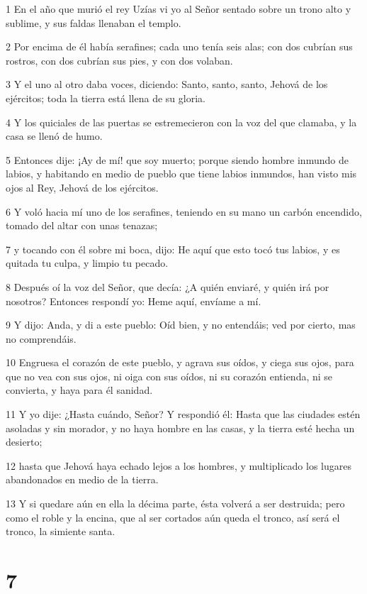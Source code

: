 \par 1 En el año que murió el rey Uzías vi yo al Señor sentado sobre un trono alto y sublime, y sus faldas llenaban el templo.
\par 2 Por encima de él había serafines; cada uno tenía seis alas; con dos cubrían sus rostros, con dos cubrían sus pies, y con dos volaban.
\par 3 Y el uno al otro daba voces, diciendo: Santo, santo, santo, Jehová de los ejércitos; toda la tierra está llena de su gloria.
\par 4 Y los quiciales de las puertas se estremecieron con la voz del que clamaba, y la casa se llenó de humo. 
\par 5 Entonces dije: ¡Ay de mí! que soy muerto; porque siendo hombre inmundo de labios, y habitando en medio de pueblo que tiene labios inmundos, han visto mis ojos al Rey, Jehová de los ejércitos.
\par 6 Y voló hacia mí uno de los serafines, teniendo en su mano un carbón encendido, tomado del altar con unas tenazas;
\par 7 y tocando con él sobre mi boca, dijo: He aquí que esto tocó tus labios, y es quitada tu culpa, y limpio tu pecado.
\par 8 Después oí la voz del Señor, que decía: ¿A quién enviaré, y quién irá por nosotros? Entonces respondí yo: Heme aquí, envíame a mí.
\par 9 Y dijo: Anda, y di a este pueblo: Oíd bien, y no entendáis; ved por cierto, mas no comprendáis.
\par 10 Engruesa el corazón de este pueblo, y agrava sus oídos, y ciega sus ojos, para que no vea con sus ojos, ni oiga con sus oídos, ni su corazón entienda, ni se convierta, y haya para él sanidad. 
\par 11 Y yo dije: ¿Hasta cuándo, Señor? Y respondió él: Hasta que las ciudades estén asoladas y sin morador, y no haya hombre en las casas, y la tierra esté hecha un desierto;
\par 12 hasta que Jehová haya echado lejos a los hombres, y multiplicado los lugares abandonados en medio de la tierra.
\par 13 Y si quedare aún en ella la décima parte, ésta volverá a ser destruida; pero como el roble y la encina, que al ser cortados aún queda el tronco, así será el tronco, la simiente santa.

\chapter{7}


